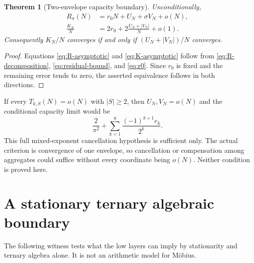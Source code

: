 \documentclass[11pt]{article}
\newtheorem{theorem}{Theorem}[section]
\theoremstyle{definition}
\theoremstyle{remark}
\begin{document}
\begin{theorem}[Two-envelope capacity boundary]
Unconditionally,
\begin{align}
 R_\sigma(N)&=r_0N+U_N+\sigma V_N+o(N),
 \label{eq:R-asymptotic}\\
 \frac{K_N}{N}&=2r_0+
       2\frac{U_N+|V_N|}{N}+o(1).
 \label{eq:K-asymptotic}
\end{align}
Consequently $K_N/N$ converges if and only if
$(U_N+|V_N|)/N$ converges.
\end{theorem}

\begin{proof}
Equations \eqref{eq:R-asymptotic} and \eqref{eq:K-asymptotic} follow from
\eqref{eq:R-decomposition}, \eqref{eq:residual-bound}, and
\eqref{eq:r0}.  Since $r_0$ is fixed and the remaining error tends to zero,
the asserted equivalence follows in both directions.
\end{proof}

If every $T_{k,S}(N)=o(N)$ with $|S|\ge2$, then $U_N,V_N=o(N)$ and the
conditional capacity limit would be
\begin{equation}
 \boxed{\displaystyle
 \frac{2}{\pi^2}+\sum_{k=1}^8\frac{(-1)^{k+1}e_k}{2^k}.}
 \label{eq:conditional-constant}
\end{equation}
This full mixed-exponent cancellation hypothesis is sufficient only.  The
actual criterion is convergence of one envelope, so cancellation or
compensation among aggregates could suffice without every coordinate being
$o(N)$.  Neither condition is proved here.

\section{A stationary ternary algebraic boundary}

The following witness tests what the low layers can imply by stationarity
and ternary algebra alone.  It is not an arithmetic model for M\"obius.
\end{document}
